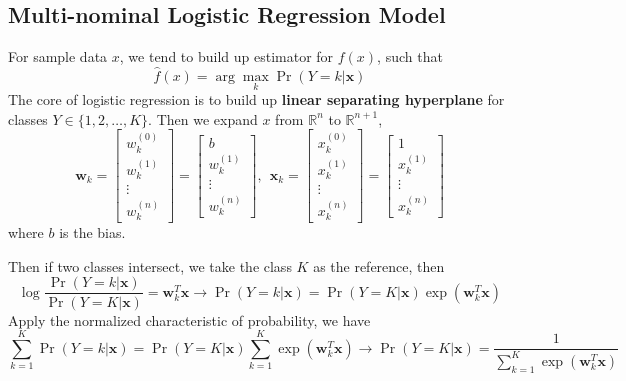 \documentclass[12pt]{article}
\begin{document}
\subsection{Multi-nominal Logistic Regression Model}
For sample data $x$, we tend to build up estimator for $f(x)$, such that
\begin{equation}
    \hat f(x) = \arg \max_{k} \Pr \left( Y = k | \bm{x}\right)
\end{equation}
The core of logistic regression is to build up \textbf{linear separating hyperplane} for classes $Y \in \{1,2,\dots,K\}$. Then we expand $x$ from $\mathbb{R}^n$ to $\mathbb{R}^{n+1}$,
\begin{equation}
    \bm{w}_{k} = \begin{bmatrix}
        w_k^{(0)} \\ w_k^{(1)} \\ \vdots \\ w_k^{(n)}
    \end{bmatrix} = \begin{bmatrix}
        b \\ w_k^{(1)} \\ \vdots \\ w_k^{(n)}
    \end{bmatrix},~~\bm{x}_k = \begin{bmatrix} x_k^{(0)} \\ x_k^{(1)} \\ \vdots \\ x_k^{(n)}
    \end{bmatrix} = \begin{bmatrix} 1 \\ x_k^{(1)} \\ \vdots \\ x_k^{(n)}
    \end{bmatrix}
\end{equation}
where $b$ is the bias. \par
Then if two classes intersect, we take the class $K$ as the reference, then
\begin{equation}
    \log \frac{\Pr(Y = k|\bm{x})}{\Pr(Y=K|\bm{x})} = \bm{w}_k^T\bm{x} \rightarrow \Pr(Y = k|\bm{x}) = \Pr(Y=K|\bm{x}) \exp(\bm{w}_k^T\bm{x})
\end{equation}
Apply the normalized characteristic of probability, we have
\begin{equation}
    \sum_{k=1}^K \Pr(Y = k|\bm{x}) = \Pr(Y = K|\bm{x})\sum_{k=1}^K\exp(\bm{w}_k^T \bm{x}) \longrightarrow \Pr(Y = K|\bm{x}) = \frac{1}{\sum_{k=1}^K \exp(\bm{w}_k^T \bm{x})}
\end{equation}
\end{document}
